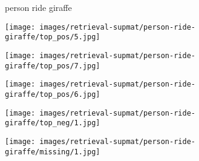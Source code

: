 \documentclass[10pt,twocolumn,letterpaper]{article}
\begin{document}
\begin{figure*}[t]
\begin{minipage}[b]{0.005\textwidth}
    	\centering
    	\begin{turn}{90}
    \small{{\color{blue}person} ride {\color{red}giraffe}}
    	\end{turn}	
    \vspace{-1.2ex}
    \end{minipage}
    \hspace{0.01\textwidth}
\begin{minipage}[t]{0.18\textwidth}
    	\centering
       	\texttt{[image: images/retrieval-supmat/person-ride-giraffe/top\_pos/5.jpg]}\\
       	\vspace{1.5ex}
    \end{minipage}
    \hspace{0.005\textwidth}
\begin{minipage}[t]{0.18\textwidth}
    	\centering
       	\texttt{[image: images/retrieval-supmat/person-ride-giraffe/top\_pos/7.jpg]}\\
       	\vspace{1.5ex}
    \end{minipage}
    \hspace{0.005\textwidth}
\begin{minipage}[t]{0.18\textwidth}
       \centering
       \texttt{[image: images/retrieval-supmat/person-ride-giraffe/top\_pos/6.jpg]}\\
       \vspace{1.5ex}
    \end{minipage}
    \hspace{0.005\textwidth}  
\begin{minipage}[t]{0.18\textwidth}
    	\centering
       	\texttt{[image: images/retrieval-supmat/person-ride-giraffe/top\_neg/1.jpg]}\\
      	\vspace{1.5ex}
    \end{minipage}  
    \hspace{0.005\textwidth}
\begin{minipage}[t]{0.18\textwidth}
    	\centering
       	\texttt{[image: images/retrieval-supmat/person-ride-giraffe/missing/1.jpg]}\\
       	\vspace{1.5ex}
    \end{minipage}
  

\end{figure*}
\end{document}
